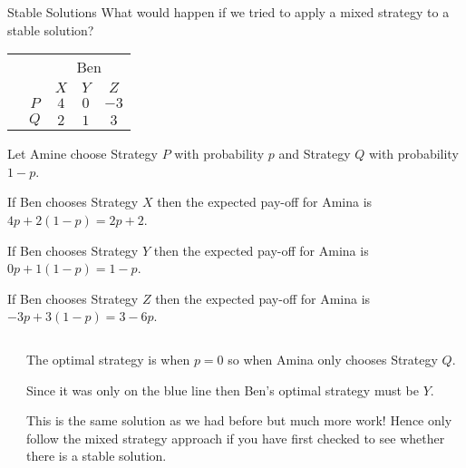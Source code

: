 \documentclass[8pt]{beamer}
\begin{document}
\begin{frame}[shrink=8]{Stable Solutions}
	What would happen if we tried to apply a mixed strategy to a stable solution?

	\begin{center}
\colorbox{cc}{
	\setlength\arrayrulewidth{0.5mm}
\begin{tabular}{cc|ccc}
	\multicolumn{2}{c}{} & \multicolumn{3}{c}{Ben} \\
	\multicolumn{1}{c}{} &  & $X$  & $Y$ & $Z$  \\ \hline
	\raisebox{0.0cm}{\multirow{2}*{\rotatebox{90}{Amina}}}  & $P$ & $4$ & $0$ & $-3$  \\
							       & $Q$ & $2$ & $1$ & $3$ \\
\end{tabular}}
\end{center}

Let Amine choose Strategy $P$ with probability $p$ and Strategy $Q$ with probability  $1-p$.

If Ben chooses Strategy $X$ then the expected pay-off for Amina is  $4p+2(1-p)= 2p+2$.

If Ben chooses Strategy  $Y$ then the expected pay-off for Amina is  $0p+1(1-p)= 1-p$.

If Ben chooses Strategy  $Z$ then the expected pay-off for Amina is  $-3p+3(1-p)= 3-6p$.
\begin{columns}
\begin{column}{.3\linewidth}

\end{column}
\begin{column}{.7\linewidth}
The optimal strategy is when $p=0$ so when Amina only chooses Strategy $Q$.

Since it was only on the blue line then Ben's optimal strategy must be  $Y$.

\alert<2>{This is the same solution as we had before but much more work! Hence only follow the mixed strategy approach if you have first checked to see whether there is a stable solution. }
\end{column}
\end{columns}

\end{frame}
\end{document}
